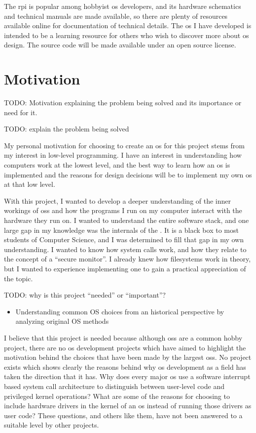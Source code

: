 \documentclass{article}
\begin{document}
The \gls{rpi} is popular among hobbyist \gls{os} developers, and its hardware
schematics and technical manuals are made available, so there are plenty of
resources available online for documentation of technical details. The \gls{os}
I have developed is intended to be a learning resource for others who wish to
discover more about \gls{os} design. The source code will be made available
under an open source license.

\section{Motivation}
TODO: Motivation explaining the problem being solved and its importance or need
for it.

TODO: explain the problem being solved

My personal motivation for choosing to create an \gls{os} for this project
stems from my interest in low-level programming. I have an interest in
understanding how computers work at the lowest level, and the best way to learn
how an \gls{os} is implemented and the reasons for design decisions will be to
implement my own \gls{os} at that low level.

With this project, I wanted to develop a deeper understanding of the inner
workings of \glspl{os} and how the programs I run on my computer interact with
the hardware they run on. I wanted to understand the entire software stack, and
one large gap in my knowledge was the internals of the . It is a
black box to most students of Computer Science, and I was determined to fill
that gap in my own understanding. I wanted to know how system calls work, and
how they relate to the concept of a ``secure monitor''. I already knew how
filesystems work in theory, but I wanted to experience implementing one to gain
a practical appreciation of the topic.

TODO: why is this project ``needed'' or ``important''?
\begin{itemize}
    \item Understanding common OS choices from an historical perspective by
        analyzing original OS methods
\end{itemize}

I believe that this project is needed because although \glspl{os} are a common
hobby project, there are no \gls{os} development projects which have aimed to
highlight the motivation behind the choices that have been made by the largest
\glspl{os}. No project exists which shows clearly the reasons behind why
\gls{os} development as a field has taken the direction that it has. Why does
every major \gls{os} use a software interrupt based system call architecture to
distinguish between user-level code and privileged kernel operations? What are
some of the reasons for choosing to include hardware drivers in the kernel of
an \gls{os} instead of running those drivers as user code? These questions, and
others like them, have not been answered to a suitable level by other projects.
\end{document}

